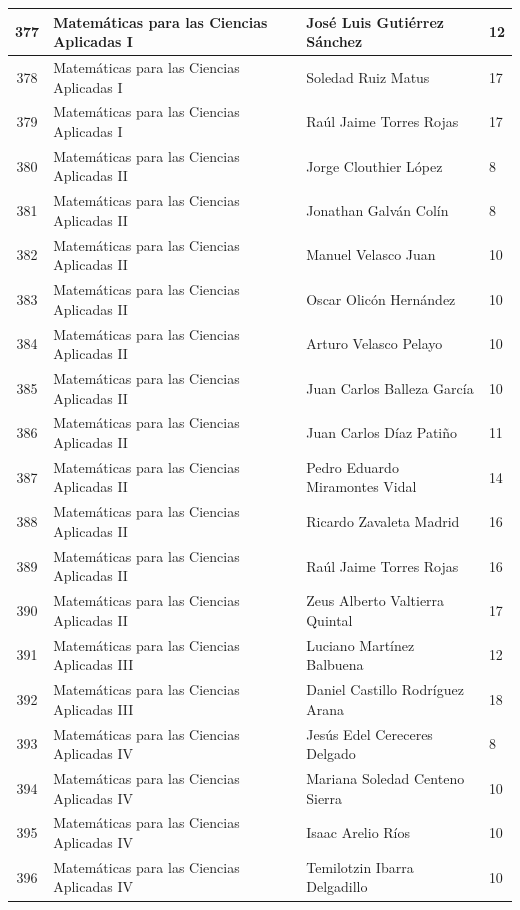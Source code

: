 {\begin{longtable}{|c|p{6.5cm}|p{5cm}|p{1.5cm}|}
377 & Matemáticas para las Ciencias Aplicadas I & José Luis Gutiérrez Sánchez & 12 \\ \hline
378 & Matemáticas para las Ciencias Aplicadas I & Soledad Ruiz Matus & 17 \\ \hline
379 & Matemáticas para las Ciencias Aplicadas I & Raúl Jaime Torres Rojas & 17 \\ \hline
380 & Matemáticas para las Ciencias Aplicadas II & Jorge Clouthier López & 8 \\ \hline
381 & Matemáticas para las Ciencias Aplicadas II & Jonathan Galván Colín & 8 \\ \hline
382 & Matemáticas para las Ciencias Aplicadas II & Manuel Velasco Juan & 10 \\ \hline
383 & Matemáticas para las Ciencias Aplicadas II & Oscar Olicón Hernández & 10 \\ \hline
384 & Matemáticas para las Ciencias Aplicadas II & Arturo Velasco Pelayo & 10 \\ \hline
385 & Matemáticas para las Ciencias Aplicadas II & Juan Carlos Balleza García & 10 \\ \hline
386 & Matemáticas para las Ciencias Aplicadas II & Juan Carlos Díaz Patiño & 11 \\ \hline
387 & Matemáticas para las Ciencias Aplicadas II & Pedro Eduardo Miramontes Vidal & 14 \\ \hline
388 & Matemáticas para las Ciencias Aplicadas II & Ricardo Zavaleta Madrid & 16 \\ \hline
389 & Matemáticas para las Ciencias Aplicadas II & Raúl Jaime Torres Rojas & 16 \\ \hline
390 & Matemáticas para las Ciencias Aplicadas II & Zeus Alberto Valtierra Quintal & 17 \\ \hline
391 & Matemáticas para las Ciencias Aplicadas III & Luciano Martínez Balbuena & 12 \\ \hline
392 & Matemáticas para las Ciencias Aplicadas III & Daniel Castillo Rodríguez Arana & 18 \\ \hline
393 & Matemáticas para las Ciencias Aplicadas IV & Jesús Edel Cereceres Delgado & 8 \\ \hline
394 & Matemáticas para las Ciencias Aplicadas IV & Mariana Soledad Centeno Sierra & 10 \\ \hline
395 & Matemáticas para las Ciencias Aplicadas IV & Isaac Arelio Ríos & 10 \\ \hline
396 & Matemáticas para las Ciencias Aplicadas IV & Temilotzin Ibarra Delgadillo & 10 \\ \hline

\end{longtable}}
